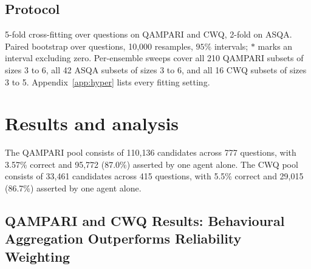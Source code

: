 \documentclass[11pt]{article}
\begin{document}
\subsection{Protocol}
\label{sec:protocol}
\label{sec:crossfit}

5-fold cross-fitting over questions on QAMPARI and CWQ, 2-fold on ASQA. Paired bootstrap over questions, 10,000 resamples, $95\%$ intervals; $*$ marks an interval excluding zero. Per-ensemble sweeps cover all 210 QAMPARI subsets of sizes 3 to 6, all 42 ASQA subsets of sizes 3 to 6, and all 16 CWQ subsets of sizes 3 to 5. Appendix~\ref{app:hyper} lists every fitting setting.

\section{Results and analysis}
\label{sec:results}

The QAMPARI pool consists of 110,136 candidates across 777 questions, with 3.57\% correct and 95,772 (87.0\%) asserted by one agent alone. The CWQ pool consists of 33,461 candidates across 415 questions, with 5.5\% correct and 29,015 (86.7\%) asserted by one agent alone.

\subsection{QAMPARI and CWQ Results: Behavioural Aggregation Outperforms Reliability Weighting}
\label{sec:rq1}
\end{document}
